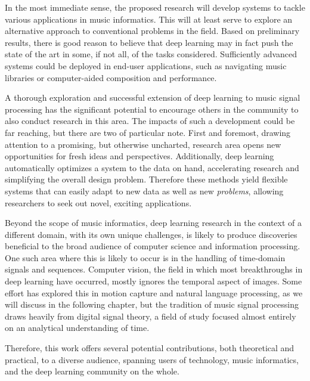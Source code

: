 In the most immediate sense, the proposed research will develop systems to tackle various applications in music informatics.
This will at least serve to explore an alternative approach to conventional problems in the field.
Based on preliminary results, there is good reason to believe that deep learning may in fact push the state of the art in some, if not all, of the tasks considered.
Sufficiently advanced systems could be deployed in end-user applications, such as navigating music libraries or computer-aided composition and performance.

A thorough exploration and successful extension of deep learning to music signal processing has the significant potential to encourage others in the community to also conduct research in this area.
The impacts of such a development could be far reaching, but there are two of particular note.
First and foremost, drawing attention to a promising, but otherwise uncharted, research area opens new opportunities for fresh ideas and perspectives.
Additionally, deep learning automatically optimizes a system to the data on hand, accelerating research and simplifying the overall design problem.
Therefore these methods yield flexible systems that can easily adapt to new data as well as new \emph{problems}, allowing researchers to seek out novel, exciting applications.

Beyond the scope of music informatics, deep learning research in the context of a different domain, with its own unique challenges, is likely to produce discoveries beneficial to the broad audience of computer science and information processing.
One such area where this is likely to occur is in the handling of time-domain signals and sequences.
Computer vision, the field in which most breakthroughs in deep learning have occurred, mostly ignores the temporal aspect of images.
Some effort has explored this in motion capture and natural language processing, as we will discuss in the following chapter, but the tradition of music signal processing draws heavily from digital signal theory, a field of study focused almost entirely on an analytical understanding of time.

Therefore, this work offers several potential contributions, both theoretical and practical, to a diverse audience, spanning users of technology, music informatics, and the deep learning community on the whole.


